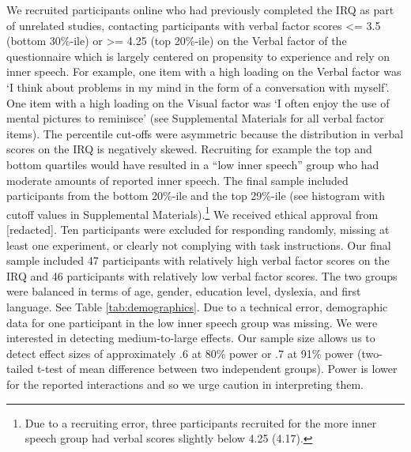 \documentclass[
  man,a4paper,floatsintext]{apa6}
\begin{document}
We recruited participants online who had previously completed the IRQ as part of unrelated studies, contacting participants with verbal factor scores \textless= 3.5 (bottom 30\%-ile) or \textgreater= 4.25 (top 20\%-ile) on the Verbal factor of the questionnaire which is largely centered on propensity to experience and rely on inner speech. For example, one item with a high loading on the Verbal factor was `I think about problems in my mind in the form of a conversation with myself'. One item with a high loading on the Visual factor was `I often enjoy the use of mental pictures to reminisce' (see Supplemental Materials for all verbal factor items). The percentile cut-offs were asymmetric because the distribution in verbal scores on the IRQ is negatively skewed. Recruiting for example the top and bottom quartiles would have resulted in a ``low inner speech'' group who had moderate amounts of reported inner speech. The final sample included participants from the bottom 20\%-ile and the top 29\%-ile (see histogram with cutoff values in Supplemental Materials).\footnote{Due to a recruiting error, three participants recruited for the more inner speech group had verbal scores slightly below 4.25 (4.17).} We received ethical approval from {[}redacted{]}. Ten participants were excluded for responding randomly, missing at least one experiment, or clearly not complying with task instructions. Our final sample included 47 participants with relatively high verbal factor scores on the IRQ and 46 participants with relatively low verbal factor scores. The two groups were balanced in terms of age, gender, education level, dyslexia, and first language. See Table \ref{tab:demographics}. Due to a technical error, demographic data for one participant in the low inner speech group was missing. We were interested in detecting medium-to-large effects. Our sample size allows us to detect effect sizes of approximately .6 at 80\% power or .7 at 91\% power (two-tailed t-test of mean difference between two independent groups). Power is lower for the reported interactions and so we urge caution in interpreting them.
\end{document}
